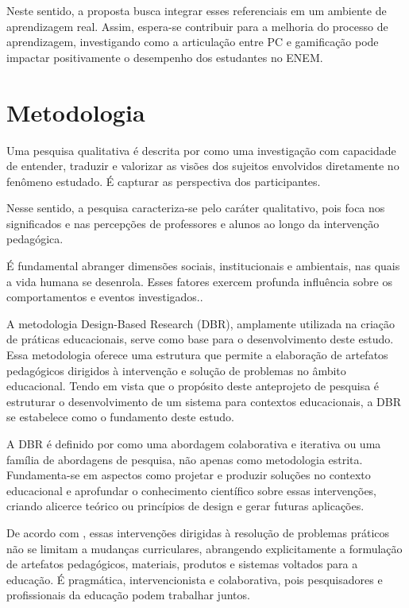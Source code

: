 \documentclass{abnt}
\begin{document}
Neste sentido, a proposta busca integrar esses referenciais em um ambiente de
aprendizagem real. Assim, espera-se contribuir para a melhoria do processo de
aprendizagem, investigando como a articulação entre PC e gamificação pode
impactar positivamente o desempenho dos estudantes no ENEM.

\chapter{Metodologia}
Uma pesquisa qualitativa é descrita por \cite{yin2016pesquisa} como uma
investigação com capacidade de entender, traduzir e valorizar as visões dos
sujeitos envolvidos diretamente no fenômeno estudado. É capturar as perspectiva
dos participantes.

Nesse sentido, a pesquisa caracteriza-se pelo caráter qualitativo, pois foca nos
significados e nas percepções de professores e alunos ao longo da intervenção
pedagógica. 

É fundamental abranger dimensões sociais, institucionais e ambientais, nas quais
a vida humana se desenrola. Esses fatores exercem profunda influência sobre os
comportamentos e eventos investigados.\cite{yin2016pesquisa}. 

A metodologia Design-Based Research (DBR), amplamente utilizada na criação de
práticas educacionais, serve como base para o desenvolvimento deste estudo. Essa
metodologia oferece uma estrutura que permite a elaboração de artefatos
pedagógicos dirigidos à intervenção e solução de problemas no âmbito
educacional. Tendo em vista que o propósito deste anteprojeto de pesquisa é
estruturar o desenvolvimento de um sistema para contextos educacionais, a DBR se
estabelece como o fundamento deste estudo.

A DBR é definido por \cite{plomp2018pesquisa} como uma abordagem colaborativa e
iterativa ou uma família de abordagens de pesquisa, não apenas como metodologia
estrita. Fundamenta-se em aspectos como projetar e produzir soluções no contexto
educacional e aprofundar o conhecimento científico sobre essas intervenções,
criando alicerce teórico ou princípios de design e gerar futuras aplicações.

De acordo com \cite{plomp2018pesquisa}, essas intervenções dirigidas à resolução
de problemas práticos não se limitam a mudanças curriculares, abrangendo
explicitamente a formulação de artefatos pedagógicos, materiais, produtos e
sistemas voltados para a educação. É pragmática, intervencionista e
colaborativa, pois pesquisadores e profissionais da educação podem trabalhar
juntos.
\end{document}
